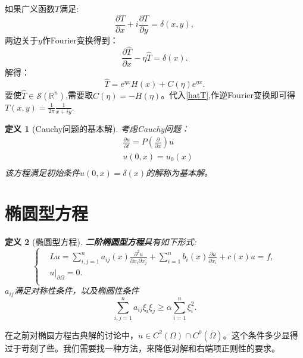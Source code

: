 \documentclass[a4paper]{ctexart}
\newtheorem{Definition}{\hspace{2em}定义}[section]
\newcommand{\Rn}{\mathbb{R}^{n}}
\newcommand{\pdfFrac}[2]{\frac{\partial #1}{\partial #2}}
\begin{document}
如果广义函数$T$满足:
\begin{equation}
    \pdfFrac{T}{x}+i\pdfFrac{T}{y}=\delta(x,y),
\end{equation}
两边关于$y$作Fourier变换得到：
\begin{equation}
    \pdfFrac{\hat{T}}{x}-\eta\hat{T}=\delta(x).
\end{equation}
解得：
\begin{equation}
    \label{hatT}
    \hat{T}=e^{\eta x}H(x)+C(\eta)e^{\eta x}.
\end{equation}
要使$\hat{T}\in\mathscr{S}(\Rn)$,需要取$C(\eta)=-H(\eta)$。代入\eqref{hatT},作逆Fourier变换即可得$T(x,y)=\frac{1}{2\pi}\frac{1}{x+iy}$.
\begin{Definition}[Cauchy问题的基本解]
    考虑Cauchy问题：
    \begin{equation}
        \begin{aligned}
            &\pdfFrac{u}{t}=P(\pdfFrac{}{x})u\\
            &u(0,x)=u_{0}(x)\\
        \end{aligned}
    \end{equation}
    该方程满足初始条件$u(0,x)=\delta(x)$的解称为基本解。
\end{Definition}
\section{椭圆型方程}
\begin{Definition}[椭圆型方程]
    \label{Elliptic}
    \textbf{二阶椭圆型方程}具有如下形式:
    \begin{equation}
        \left\{
            \begin{aligned}
                &Lu=\sum_{i,j=1}^{n}a_{ij}(x)\pdfFrac{^2u}{x_{i}\partial x_{j}}+\sum_{i=1}^{n}b_{i}(x)\pdfFrac{u}{x_{i}}+c(x)u=f,\\
                &u|_{\partial\Omega}=0.\\
            \end{aligned}
        \right.
    \end{equation}
    $a_{ij}$满足对称性条件，以及椭圆性条件
    \begin{equation}
        \sum_{i,j=1}^{n}a_{ij}\xi_{i}\xi_{j}\ge\alpha\sum_{i=1}^{n}\xi_{i}^{2}.
    \end{equation}
\end{Definition}
在之前对椭圆方程古典解的讨论中，$u\in C^{2}(\Omega)\cap C^{0}(\overline{\Omega})$。这个条件多少显得过于苛刻了些。我们需要找一种方法，来降低对解和右端项正则性的要求。
\end{document}

